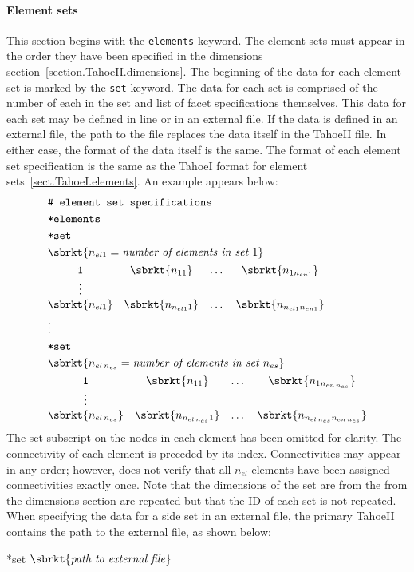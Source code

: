 \paragraph{Element sets}
This section begins with the \texttt{elements} keyword.
The element sets must appear in the order they have been specified in 
the dimensions section~\ref{section.TahoeII.dimensions}. The 
beginning of the data for each element set is marked by the \texttt{set} 
keyword. The data for each set is comprised of the number of each in 
the set and list of facet specifications themselves. 
This data for each set may be 
defined in line or in an external file. If the data is defined in an 
external file, the path to the file replaces the data itself in the 
TahoeII file. In either case, the format of the data itself is the 
same. The format of each element set specification is the same as the TahoeI 
format for element sets~\ref{sect.TahoeI.elements}. An example appears 
below:
\begin{align}
& \texttt{\# element set specifications} \notag \\
& \texttt{*elements} \notag \\
& \texttt{*set} \notag \\
& \sbrkt{n_{el1} = \textit{number of elements in set~}1} \notag \\
& \begin{matrix}
\texttt{1} & \sbrkt{n_{11}} & \dots  & \sbrkt{n_{1n_{en1}}} \\
\vdots \\
\sbrkt{n_{el1}} & \sbrkt{n_{n_{el1}1}} & \dots  & \sbrkt{n_{n_{el1}n_{en1}}}
\end{matrix} \notag \\
& \vdots \notag \\
& \texttt{*set} \notag \\
& \sbrkt{n_{el\,n_{es}} = \textit{number of elements in set~}n_{es}} \notag \\
& \begin{matrix}
\texttt{1} & \sbrkt{n_{11}} & \dots  & \sbrkt{n_{1n_{en\,n_{es}}}} \\
\vdots \\
\sbrkt{n_{el\,n_{es}}} & \sbrkt{n_{n_{el\,n_{es}}1}} & \dots  & 
\sbrkt{n_{n_{el\,n_{es}}n_{en\,n_{es}}}}
\end{matrix} \notag
\end{align}
The set subscript on the nodes in each element has been omitted for 
clarity.
The connectivity of each element is preceded by its index. 
Connectivities may appear in any order; 
however, \tahoe does not verify that all $n_{el}$ 
elements have been assigned connectivities exactly once.
Note that the dimensions of the set are from the from the dimensions 
section are repeated but that the ID of each set is not repeated.
When specifying the data for a side set in an external file, the 
primary TahoeII contains the path to the external file, as shown below:
\begin{inputfile}
*set \(\sbrkt{\textrm{\textit{path to external file}}}\)
\end{inputfile}

